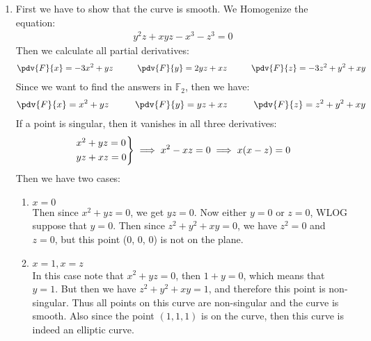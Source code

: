 \begin{enumerate}[label=]
    \item 
        First we have to show that the curve is smooth. We Homogenize the equation:
        \begin{gather*}
            y^2z + xyz - x^3 - z^3 = 0
        \end{gather*}
        Then we calculate all partial derivatives:
        \begin{gather*}
            \pdv{F}{x} = -3x^2 + yz \hspace{1cm}
            \pdv{F}{y} = 2yz + xz \hspace{1cm}
            \pdv{F}{z} = -3z^2 + y^2 + xy
        \end{gather*}
        Since we want to find the answers in $\mathbb F_2$, then we have:
        \begin{gather*}
            \pdv{F}{x} = x^2 + yz \hspace{1cm}
            \pdv{F}{y} = yz + xz \hspace{1cm}
            \pdv{F}{z} = z^2 + y^2 + xy
        \end{gather*} 
        If a point is singular, then it vanishes in all three derivatives:
        \begin{gather*}
            \begin{rcases}
            x^2 + yz = 0 \\
            yz + xz = 0 
            \end{rcases} \implies
            x^2 - xz = 0 \implies x(x - z) = 0
        \end{gather*}
        Then we have two cases:
        \begin{enumerate}[label=\alph*)]
            \item $x = 0$ \\
                Then since $x^2 + yz = 0$, we get $yz = 0$. Now either $y = 0$ or $z = 0$, WLOG suppose that $y = 0$. Then since $z^2 + y^2 + xy = 0$, we have $z^2 = 0$ and $z = 0$, but this point (0, 0, 0) is not on the plane.
            \item $x = 1, x = z$ \\
                In this case note that $x^2 + yz = 0$, then $1 + y = 0$, which means that $y = 1$. 
                But then we have $z^2 + y^2 + xy = 1$, and therefore this point is non-singular.
                Thus all points on this curve are non-singular and the curve is smooth. Also since the point $(1, 1, 1)$ is on the curve, then this curve is indeed an elliptic curve.

\end{enumerate}
\end{enumerate}

